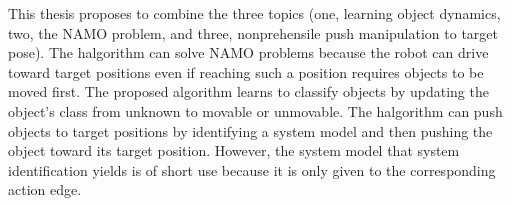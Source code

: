 This thesis proposes to combine the three topics (one, learning object dynamics, two, the \ac{NAMO} problem, and three, nonprehensile push manipulation to target pose). The \ac{halgorithm} can solve \ac{NAMO} problems because the robot can drive toward target positions even if reaching such a position requires objects to be moved first. The proposed algorithm learns to classify objects by updating the object's class from unknown to movable or unmovable. The \ac{halgorithm} can push objects to target positions by identifying a system model and then pushing the object toward its target position. However, the system model that system identification yields is of short use because it is only given to the corresponding action edge.\bs

